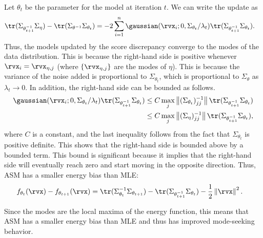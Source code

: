 Let $\theta_{t}$ be the parameter for the model at iteration $t$. We can write the update as 
\begin{align*}
    \tr(\Sigma_{\theta_{t+1}^{-1}} \Sigma_{\eta}) - \tr(\Sigma_{\theta^{-1}} \Sigma_{\theta_{t}}) &= -2 \sum_{i=1}^{n} \gaussian(\rvx_{i} ; 0, \Sigma_{\theta_{t}} / \lambda_{t}) \tr(\Sigma_{\theta_{t+1}^{-1}} \Sigma_{\theta_{t}}).
\end{align*}
Thus, the models updated by the score discrepancy converge to the modes of the data distribution. This is because the right-hand side is positive whenever $\rvx_{i} = \rvx_{\eta, j}$ (where $\{\rvx_{\eta, j}\}$ are the modes of $\eta$). This is because the variance of the noise added is proportional to $\Sigma_{\theta_{t}}$, which is proportional to $\Sigma_{\theta}$ as $\lambda_{t} \to 0$. In addition, the right-hand side can be bounded as follows.
\begin{align*}
	\gaussian(\rvx_{i} ; 0, \Sigma_{\theta_{t}} / \lambda_{t}) \tr(\Sigma_{\theta_{t+1}^{-1}} \Sigma_{\theta_{t}}) &\leq C \max_{j} \left\| (\Sigma_{\theta_{t}})^{-1}_{jj} \right\| \tr(\Sigma_{\theta_{t+1}^{-1}} \Sigma_{\theta_{t}}) \\
	& \leq C \max_{j} \left\| (\Sigma_{\eta})^{-1}_{jj}\right\|  \tr(\Sigma_{\theta_{t+1}^{-1}} \Sigma_{\theta_{t}}),
\end{align*}
where $C$ is a constant, and the last inequality follows from the fact that $\Sigma_{\theta_{t}}$ is positive definite. This shows that the right-hand side is bounded above by a bounded term. This bound is significant because it implies that the right-hand side will eventually reach zero and start moving in the opposite direction. Thus, ASM has a smaller energy bias than MLE:
\begin{align*}
    f_{\theta_{t}}(\rvx) - f_{\theta_{t+1}}(\rvx) &= \tr(\Sigma_{\theta_{t}}^{-1} \Sigma_{\theta_{t+1}}) - \tr(\Sigma_{\theta_{t+1}^{-1}} \Sigma_{\theta_{t}}) - \frac{1}{2} \left\| \rvx  \right\|^{2}.
\end{align*}

Since the modes are the local maxima of the energy function, this means that ASM has a smaller energy bias than MLE and thus has improved mode-seeking behavior.

